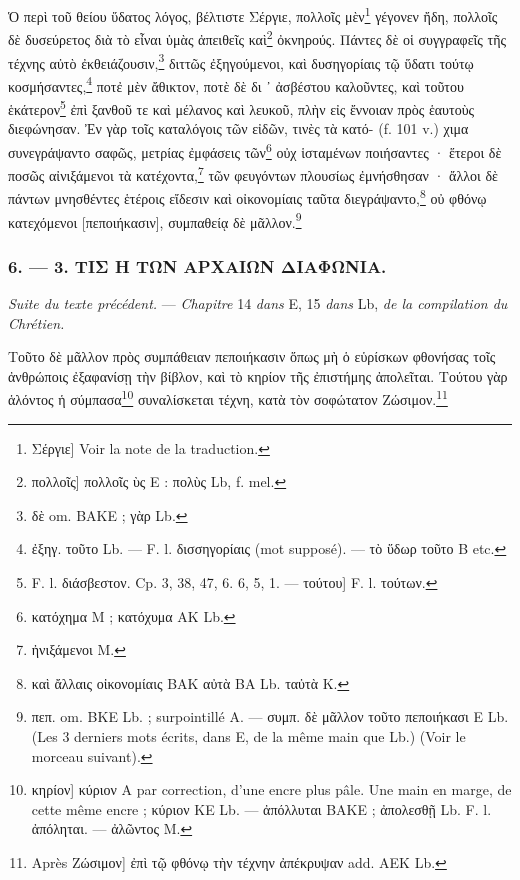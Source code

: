 \documentclass[a4paper, 11pt, oneside, polutonikogreek, french]{article}
\begin{document}
Ὁ περὶ τοῦ θείου ὕδατος λόγος, βέλτιστε Σέργιε, πολλοῖς μὲν\footnote{Σέργιε] Voir la note de la traduction.} γέγονεν ἤδη, πολλοῖς δὲ δυσεύρετος διὰ τὸ εἶναι ὑμὰς ἀπειθεῖς καὶ\footnote{πολλοῖς] πολλοῖς ὺς E : πολὺς Lb, f. mel.} ὀκνηρούς. Πάντες δὲ οἱ συγγραφεῖς τῆς τέχνης αὐτὸ ἐκθειάζουσιν,\footnote{δὲ om. BAKE ; γὰρ Lb.} διττῶς ἐξηγούμενοι, καὶ δυσηγορίαις τῷ ὕδατι τούτῳ κοσμήσαντες,\footnote{ἐξηγ. τοῦτο Lb. --- F. l. δισσηγορίαις (mot supposé). --- τὸ ὕδωρ τοῦτο B etc.} ποτἐ μὲν ἄθικτον, ποτὲ δὲ δι ᾽ ἀσβέστου καλοῦντες, καὶ τοῦτου ἑκάτερον\footnote{F. l. διάσβεστον. Cp. 3, 38, 47, 6. 6, 5, 1. --- τούτου] F. l. τούτων.} ἐπὶ ξανθοῦ τε καὶ μέλανος καὶ λευκοῦ, πλὴν εἰς ἔννοιαν πρὸς ἑαυτοὺς διεφώνησαν. Ἐν γὰρ τοῖς καταλόγοις τῶν εἰδῶν, τινὲς τὰ κατό- (f. 101 v.) χιμα συνεγράψαντο σαφῶς, μετρίας ἐμφάσεις τῶν\footnote{κατόχημα M ; κατόχυμα AK Lb.} οὐχ ἱσταμένων ποιήσαντες · ἕτεροι δὲ ποσῶς αἰνιξάμενοι τὰ κατέχοντα,\footnote{ἠνιξάμενοι M.} τῶν φευγόντων πλουσίως ἐμνήσθησαν · ἄλλοι δὲ πάντων μνησθέντες ἑτέροις εἴδεσιν καὶ οἰκονομίαις ταῦτα διεγράψαντο,\footnote{καὶ ἄλλαις οἰκονομίαις BAK αὐτὰ BA Lb. ταὐτὰ K.} οὐ φθόνῳ κατεχόμενοι [πεποιήκασιν], συμπαθείᾳ δὲ μᾶλλον.\footnote{πεπ. om. BKE Lb. ; surpointillé A. --- συμπ. δὲ μᾶλλον τοῦτο πεποιήκασι E Lb. (Les 3 derniers mots écrits, dans E, de la même main que Lb.) (Voir le morceau suivant).}

\bigskip
\centerline{\EightStarTaper}
\centerline{\EightStarTaper\EightStarTaper}
\bigskip

\subsubsection{6. --- 3. ΤΙΣ Η ΤΩΝ ΑΡΧΑΙΩΝ ΔΙΑΦΩΝΙΑ.}

\emph{Suite du texte précédent.} --- \emph{Chapitre} 14 \emph{dans} E, 15 \emph{dans} Lb, \emph{de la compilation du Chrétien.}

Τοῦτο δὲ μᾶλλον πρὸς συμπάθειαν πεποιήκασιν ὅπως μὴ ὁ εὑρίσκων φθονήσας τοῖς ἀνθρώποις ἐξαφανίσῃ τὴν βίβλον, καὶ τὸ κηρίον τῆς ἐπιστήμης ἀπολεῖται. Τούτου γὰρ ἁλόντος ἡ σύμπασα\footnote{κηρίον] κύριον A par correction, d'une encre plus pâle. Une main en marge, de cette même encre ; κύριον KE Lb. --- ἀπόλλυται BAKE ; ἀπολεσθῇ Lb. F. l. ἀπόληται. --- ἀλῶντος M.} συναλίσκεται τέχνη, κατὰ τὸν σοφώτατον Ζώσιμον.\footnote{Après Ζώσιμον] ἐπὶ τῷ φθόνῳ τὴν τέχνην ἀπέκρυψαν add. AEK Lb.}
\end{document}
